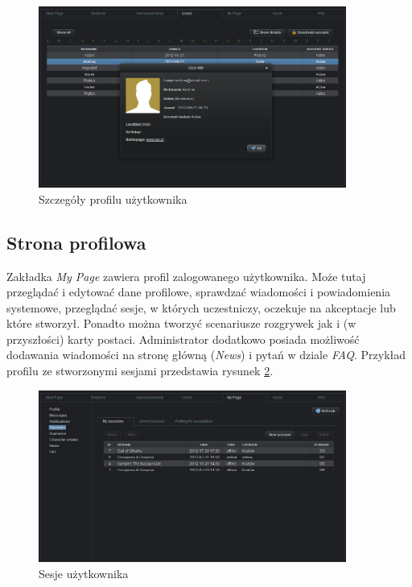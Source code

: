 \begin{figure}[htb]	
\centering
\includegraphics[width=0.9\textwidth]{./img/interfejsy/users_details}
\caption{Szczegóły profilu użytkownika}
\label{fig:users_details}
\end{figure}

\subsection{Strona profilowa}
\label{sec:my_page}
Zakładka \emph{My Page} zawiera profil zalogowanego użytkownika. Może tutaj przeglądać i edytować dane profilowe, sprawdzać wiadomości i powiadomienia systemowe, przeglądać sesje, w których uczestniczy, oczekuje na akceptacje lub które stworzył. Ponadto można tworzyć scenariusze rozgrywek jak i (w przyszłości) karty postaci. Administrator dodatkowo posiada możliwość dodawania wiadomości na stronę główną (\emph{News}) i pytań w dziale \emph{FAQ}. Przykład profilu ze stworzonymi sesjami przedstawia rysunek \ref{fig:mypage_sessions}.

\begin{figure}[htb]	
\centering
\includegraphics[width=0.9\textwidth]{./img/interfejsy/mypage_sessions}
\caption{Sesje użytkownika}
\label{fig:mypage_sessions}
\end{figure}

